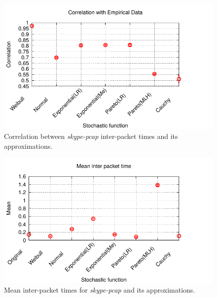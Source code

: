 \begin{figure}[ht!]
{\centering
\includegraphics[width=\columnwidth]{figures/Skype_Correlation}
\caption{Correlation between \textit{skype-pcap} inter-packet times and its approximations.}
\label{fig:skype-correlation}\par}
\end{figure}

\begin{figure}[ht!]
{\centering
\includegraphics[width=\columnwidth]{figures/Skype_Mean}
\caption{Mean inter-packet times for \textit{skype-pcap} and its approximations.}
\label{fig:skype-mean}\par}
\end{figure}


